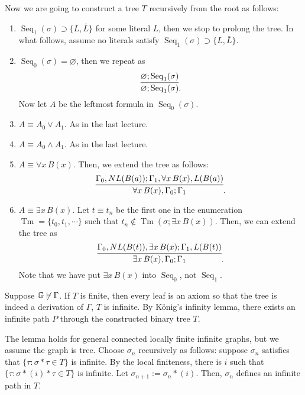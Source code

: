 \documentclass{../../../small}
\DeclareMathOperator{\Tm}{Tm}
\DeclareMathOperator{\Seq}{Seq}
\begin{document}
Now we are going to construct a tree $T$ recursively from the root as follows:
\begin{enumerate}
\item
$\Seq_1(\sigma)\supset\{L,\bar{L}\}$ for some literal $L$, then we stop to prolong the tree.
In what follows, assume no literals satisfy $\Seq_1(\sigma)\supset\{L,\bar{L}\}$.

\item
$\Seq_0(\sigma)=\varnothing$, then we repeat as
\[\infer{\varnothing;\Seq_1(\sigma)}{\varnothing;\Seq_1(\sigma)}.\]
Now let $A$ be the leftmost formula in $\Seq_0(\sigma)$.

\item
$A\equiv A_0\vee A_1$.
As in the last lecture.

\item
$A\equiv A_0\wedge A_1$.
As in the last lecture.

\item
$A\equiv\forall x\,B(x)$.
Then, we extend the tree as follows:
\[\infer{\forall x\,B(x),\Gamma_0;\Gamma_1}{\Gamma_0,NL(B(a));\Gamma_1,\forall x\,B(x),L(B(a))}.\]

\item
$A\equiv\exists x\,B(x)$.
Let $t\equiv t_n$ be the first one in the enumeration $\Tm=\{t_0,t_1,\cdots\}$ such that $t_n\notin\Tm(\sigma;\exists x\,B(x))$.
Then, we can extend the tree as
\[\infer{\exists x\,B(x),\Gamma_0;\Gamma_1}{\Gamma_0,NL(B(t)),\exists x\,B(x);\Gamma_1,L(B(t))}.\]
Note that we have put $\exists x\,B(x)$ into $\Seq_0$, not $\Seq_1$.
\end{enumerate}

Suppose $\mathbb{G}\not\vdash\Gamma$.
If $T$ is finite, then every leaf is an axiom so that the tree is indeed a derivation of $\Gamma$, $T$ is infinite.
By K\"onig's infinity lemma, there exists an infinite path $P$ through the constructed binary tree $T$.

\begin{pf}
The lemma holds for general connected locally finite infinite graphs, but we assume the graph is tree.
Choose $\sigma_n$ recursively as follows: suppose $\sigma_n$ satisfies that $\{\tau:\sigma*\tau\in T\}$ is infinite.
By the local finiteness, there is $i$ such that $\{\tau:\sigma*(i)*\tau\in T\}$ is infinite.
Let $\sigma_{n+1}:=\sigma_n*(i)$.
Then, $\sigma_n$ defines an infinite path in $T$.
\end{pf}
\end{document}
